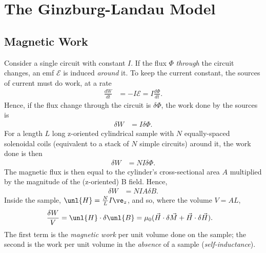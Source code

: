 \documentclass[a4paper, 11pt, normalem]{report}
\begin{document}
\chapter{The Ginzburg-Landau Model}
\section{Magnetic Work}
Consider a single circuit with constant $I$.
If the flux $\Phi$ \emph{through} the circuit changes, an emf $\mathcal{E}$ is induced \emph{around} it.
To keep the current constant, the sources of current must do work, at a rate
\begin{align}
    \frac{dW}{dt} &= -I\mathcal{E} = I\frac{d\Phi}{dt}.
\end{align}
Hence, if the flux change through the circuit is $\delta\Phi$, the work done by the sources is
\begin{align}
    \delta W &= I\delta\Phi.
\end{align}
For a length $L$ long z-oriented cylindrical sample with $N$ equally-spaced solenoidal coils (equivalent to a stack of $N$ simple circuits) around it, the work done is then
\begin{align}
    \delta W &= NI\delta\Phi.
\end{align}
The magnetic flux is then equal to the cylinder's cross-sectional area $A$ multiplied by the magnitude of the (z-oriented) B field.
Hence,
\begin{align}
    \delta W &= NIA\delta B.
\end{align}
Inside the sample, $\unl{H}=\frac{N}{L}I\ve_z$, and so, where the volume $V=AL$,
\begin{align}
    \frac{\delta W}{V} &= \unl{H}\cdot\delta\unl{B} = \mu_0(\vec{H}\cdot\delta\vec{M}+\vec{H}\cdot\delta\vec{H}).
\end{align}
The first term is the \emph{magnetic work} per unit volume done on the sample; the second is the work per unit volume in the \emph{absence} of a sample (\emph{self-inductance}).
\end{document}
